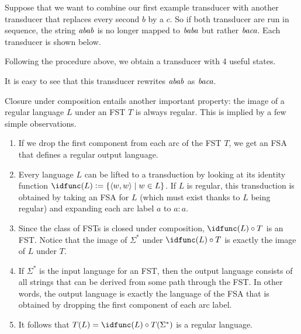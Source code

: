 \begin{examplebox}
    Suppose that we want to combine our first example transducer with another transducer that replaces every second $b$ by a $c$.
    So if both transducer are run in sequence, the string $\mathit{abab}$ is no longer mapped to $\mathit{baba}$ but rather $\mathit{baca}$.
    Each transducer is shown below.
    \begin{center}
        
        
    \end{center}
    Following the procedure above, we obtain a transducer with 4 useful states.
    \begin{center}
        
    \end{center}
    It is easy to see that this transducer rewrites $\mathit{abab}$ as $\mathit{baca}$. 
\end{examplebox}
%
Closure under composition entails another important property: the image of a regular language $L$ under an FST $T$ is always regular.
This is implied by a few simple observations.
%
\begin{enumerate}
    \item If we drop the first component from each arc of the FST $T$, we get an FSA that defines a regular output language.
    \item Every language $L$ can be lifted to a transduction by looking at its identity function $\idfunc(L) \is \setof{\tuple{w,w} \mid w \in L}$.
        If $L$ is regular, this transduction is obtained by taking an FSA for $L$ (which must exist thanks to $L$ being regular) and expanding each arc label $a$ to $a:a$.
    \item Since the class of FSTs is closed under composition, $\idfunc(L) \circ T$ is an FST\@.
        Notice that the image of $\Sigma^*$ under $\idfunc(L) \circ T$ is exactly the image of $L$ under $T$.
    \item If $\Sigma^*$ is the input language for an FST, then the output language consists of all strings that can be derived from some path through the FST\@.
        In other words, the output language is exactly the language of the FSA that is obtained by dropping the first component of each arc label.
    \item It follows that $T(L) = \idfunc(L) \circ T(\Sigma^*)$ is a regular language.
\end{enumerate}
%

